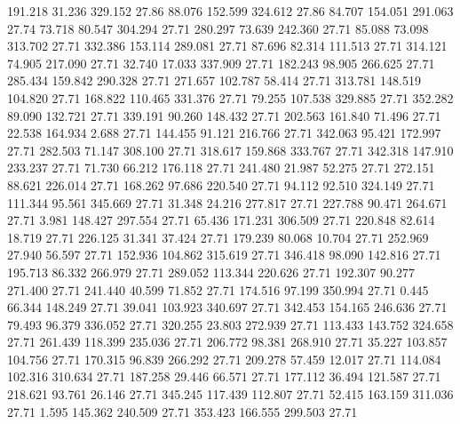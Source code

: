  191.218   31.236  329.152        27.86
  88.076  152.599  324.612        27.86
  84.707  154.051  291.063        27.74
  73.718   80.547  304.294        27.71
 280.297   73.639  242.360        27.71
  85.088   73.098  313.702        27.71
 332.386  153.114  289.081        27.71
  87.696   82.314  111.513        27.71
 314.121   74.905  217.090        27.71
  32.740   17.033  337.909        27.71
 182.243   98.905  266.625        27.71
 285.434  159.842  290.328        27.71
 271.657  102.787   58.414        27.71
 313.781  148.519  104.820        27.71
 168.822  110.465  331.376        27.71
  79.255  107.538  329.885        27.71
 352.282   89.090  132.721        27.71
 339.191   90.260  148.432        27.71
 202.563  161.840   71.496        27.71
  22.538  164.934    2.688        27.71
 144.455   91.121  216.766        27.71
 342.063   95.421  172.997        27.71
 282.503   71.147  308.100        27.71
 318.617  159.868  333.767        27.71
 342.318  147.910  233.237        27.71
  71.730   66.212  176.118        27.71
 241.480   21.987   52.275        27.71
 272.151   88.621  226.014        27.71
 168.262   97.686  220.540        27.71
  94.112   92.510  324.149        27.71
 111.344   95.561  345.669        27.71
  31.348   24.216  277.817        27.71
 227.788   90.471  264.671        27.71
   3.981  148.427  297.554        27.71
  65.436  171.231  306.509        27.71
 220.848   82.614   18.719        27.71
 226.125   31.341   37.424        27.71
 179.239   80.068   10.704        27.71
 252.969   27.940   56.597        27.71
 152.936  104.862  315.619        27.71
 346.418   98.090  142.816        27.71
 195.713   86.332  266.979        27.71
 289.052  113.344  220.626        27.71
 192.307   90.277  271.400        27.71
 241.440   40.599   71.852        27.71
 174.516   97.199  350.994        27.71
   0.445   66.344  148.249        27.71
  39.041  103.923  340.697        27.71
 342.453  154.165  246.636        27.71
  79.493   96.379  336.052        27.71
 320.255   23.803  272.939        27.71
 113.433  143.752  324.658        27.71
 261.439  118.399  235.036        27.71
 206.772   98.381  268.910        27.71
  35.227  103.857  104.756        27.71
 170.315   96.839  266.292        27.71
 209.278   57.459   12.017        27.71
 114.084  102.316  310.634        27.71
 187.258   29.446   66.571        27.71
 177.112   36.494  121.587        27.71
 218.621   93.761   26.146        27.71
 345.245  117.439  112.807        27.71
  52.415  163.159  311.036        27.71
   1.595  145.362  240.509        27.71
 353.423  166.555  299.503        27.71
